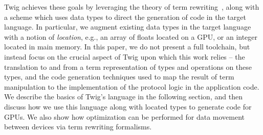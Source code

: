 Twig achieves these goals by leveraging the theory of term
rewriting~\cite{baader98rewriting}, along with a scheme which uses data types to
direct the generation of code in the target language. In particular, we augment
existing data types in the target language with a notion of \emph{location},
e.g., an array of floats located on a GPU, or an integer located in main memory.
In this paper, we do not present a full toolchain, but instead focus on the
crucial aspect of Twig upon which this work relies -- the translation to and
from a term representation of types and operations on these types, and the code
generation techniques used to map the result of term manipulation to the
implementation of the protocol logic in the application code. We describe the
basics of Twig's language in the following section, and then discuss how we use
this language along with located types to generate code for GPUs. We also show
how optimization can be performed for data movement between devices via term
rewriting formalisms.
